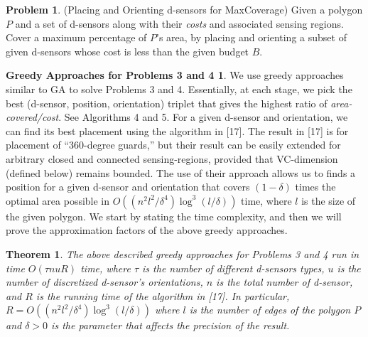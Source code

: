 \documentclass[conference]{IEEEtran}
\newtheorem{theorem}{Theorem}
\theoremstyle{definition}
\newtheorem{problem}{Problem}
\newtheorem*{GreedyApproacha}{Greedy Approaches for Problems 3 and 4}
\newtheorem*{NP-Hardness of Approximating the SODkC Problem}{NP-Hardness of Approximating the SODkC Problem}
\newtheorem*{Greedy Algorithm (GA)}{Greedy Algorithm (GA)}
\newtheorem*{GA on the Running Example}{GA on the Running Example}
\newtheorem*{Performance Guarantee of GA}{Performance Guarantee of GA}
\begin{document}
\begin{problem}
(Placing and Orienting d-sensors for MaxCoverage) Given a polygon $P$ and a set of d-sensors along with their \textit{costs} and associated sensing regions. Cover a maximum percentage of $P$’s area, by placing and orienting a subset of given d-sensors whose cost is less than the given budget $B$.
\end{problem}

\begin{GreedyApproacha}
We use greedy approaches similar to GA to solve Problems 3 and 4. Essentially, at each stage, we pick the best (d-sensor, position, orientation) triplet that gives the highest ratio of \textit{area-covered/cost}. See Algorithms 4 and 5. For a given d-sensor and orientation, we can find its best placement using the algorithm in [17]. The result in [17] is for placement of “360-degree guards,” but their result can be easily extended for arbitrary closed and connected sensing-regions, provided that VC-dimension (defined below) remains bounded. The use of their approach allows us to finds a position for a given d-sensor and orientation that covers $(1 - \delta)$ times the optimal area possible in $O((n^2 l^2/\delta^4) \log^3(l/\delta))$ time, where $l$ is the size of the given polygon. We start by stating the time complexity, and then we will prove the approximation
factors of the above greedy approaches.
\end{GreedyApproacha}

\begin{algorithm}
\caption{Placing and orienting d-sensors for min-cost
coverage}    
\end{algorithm}

\begin{theorem}
The above described greedy approaches for Problems 3 and 4 run in time $O(\tau nuR)$ time, where $\tau$ is the number of different d-sensors types, $u$ is the number of discretized d-sensor’s orientations, $n$ is the total number of d-sensor, and $R$ is the running time of the algorithm in [17]. In particular, $R = O((n^2 l^2 /\delta^4) \log^3(l/\delta))$ where $l$ is the number of edges of the polygon $P$ and $\delta > 0$ is the parameter that affects the precision of the result.
\end{theorem}
\end{document}
